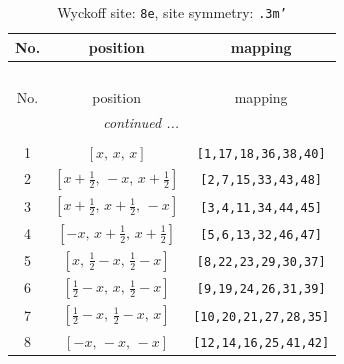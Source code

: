 \documentclass[fleqn,8pt]{jsarticle}
\begin{document}
\renewcommand{\arraystretch}{1.2}
\begin{longtable}{ccc}
\caption{Wyckoff site: {\tt 8e}, site symmetry: {\tt .3m'}}
 \\
 \hline \hline
No. & position & mapping \\ \hline \endfirsthead

\multicolumn{2}{l}{\tablename\ \thetable{}} \\
 \hline \hline
No. & position & mapping \\ \hline \endhead

 \hline \hline
\multicolumn{2}{r}{\footnotesize\it continued ...} \\ \endfoot

 \hline \hline
\multicolumn{2}{r}{} \\ \endlastfoot

1 & $\left[ x,\, x,\, x \right]$ & {\tt [1,17,18,36,38,40]} \\ \hline
2 & $\left[ x + \frac{1}{2},\, - x,\, x + \frac{1}{2} \right]$ & {\tt [2,7,15,33,43,48]} \\ \hline
3 & $\left[ x + \frac{1}{2},\, x + \frac{1}{2},\, - x \right]$ & {\tt [3,4,11,34,44,45]} \\ \hline
4 & $\left[ - x,\, x + \frac{1}{2},\, x + \frac{1}{2} \right]$ & {\tt [5,6,13,32,46,47]} \\ \hline
5 & $\left[ x,\, \frac{1}{2} - x,\, \frac{1}{2} - x \right]$ & {\tt [8,22,23,29,30,37]} \\ \hline
6 & $\left[ \frac{1}{2} - x,\, x,\, \frac{1}{2} - x \right]$ & {\tt [9,19,24,26,31,39]} \\ \hline
7 & $\left[ \frac{1}{2} - x,\, \frac{1}{2} - x,\, x \right]$ & {\tt [10,20,21,27,28,35]} \\ \hline
8 & $\left[ - x,\, - x,\, - x \right]$ & {\tt [12,14,16,25,41,42]} \\
\end{longtable}
\renewcommand{\arraystretch}{1.2}
\end{document}
